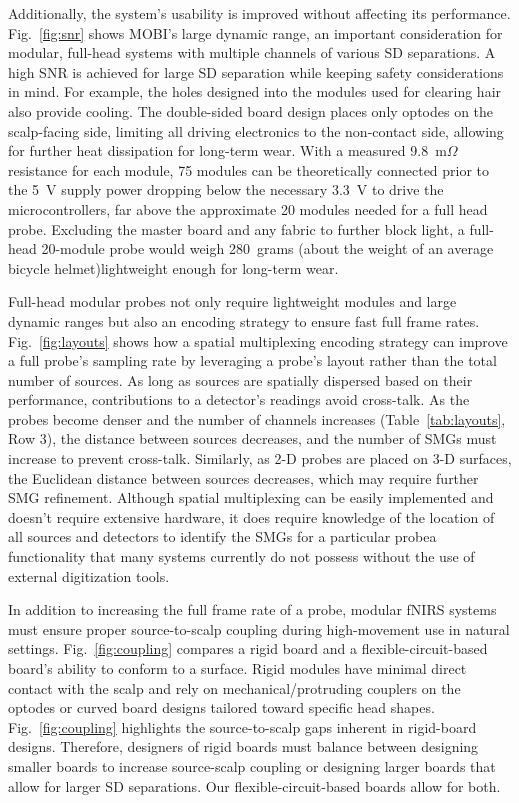 Additionally, the system's usability is improved without affecting its performance. Fig.~\ref{fig:snr} shows \ac{MOBI}'s large dynamic range, an important consideration for modular, full-head systems with multiple channels of various SD separations. A high SNR is achieved for large SD separation while keeping safety considerations in mind. For example, the holes designed into the modules used for clearing hair also provide cooling. The double-sided board design places only optodes on the scalp-facing side, limiting all driving electronics to the non-contact side, allowing for further heat dissipation for long-term wear. With a measured 9.8~m$\Omega$ resistance for each module, 75 modules can be theoretically connected prior to the 5~V supply power dropping below the necessary 3.3~V to drive the microcontrollers, far above the approximate 20 modules needed for a full head probe. Excluding the master board and any fabric to further block light, a full-head 20-module probe would weigh 280~grams (about the weight of an average bicycle helmet)\textemdash lightweight enough for long-term wear. %

Full-head modular probes not only require lightweight modules and large dynamic ranges but also an encoding strategy to ensure fast full frame rates. Fig.~\ref{fig:layouts} shows how a spatial multiplexing encoding strategy can improve a full probe's sampling rate by leveraging a probe's layout rather than the total number of sources. As long as sources are spatially dispersed based on their performance, contributions to a detector's readings avoid cross-talk. As the probes become denser and the number of channels increases (Table~\ref{tab:layouts}, Row 3), the distance between sources decreases, and the number of SMGs must increase to prevent cross-talk. Similarly, as 2-D probes are placed on 3-D surfaces, the Euclidean distance between sources decreases, which may require further SMG refinement. Although spatial multiplexing can be easily implemented and doesn't require extensive hardware, it does require knowledge of the location of all sources and detectors to identify the SMGs for a particular probe\textemdash a functionality that many systems currently do not possess without the use of external digitization tools.  

In addition to increasing the full frame rate of a probe, modular \ac{fNIRS} systems must ensure proper source-to-scalp coupling during high-movement use in natural settings. Fig.~\ref{fig:coupling} compares a rigid board and a flexible-circuit-based board's ability to conform to a surface. Rigid modules have minimal direct contact with the scalp and rely on mechanical/protruding couplers on the optodes or curved board designs tailored toward specific head shapes. Fig.~\ref{fig:coupling} highlights the source-to-scalp gaps inherent in rigid-board designs. Therefore, designers of rigid boards must balance between designing smaller boards to increase source-scalp coupling or designing larger boards that allow for larger SD separations. Our flexible-circuit-based boards allow for both. 

